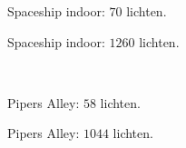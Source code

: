\begin{figure}[p]
  \begin{adjustbox}{minipage=\textwidth, scale=0.6}
    \begin{subfigure}[b]{0.83\textwidth}
      \centering
      \def\svgwidth{\textwidth}
      
      \caption{Spaceship indoor: $70$ lichten.}
      \label{fig:hs-nodesize-construction-time::si-low}
    \end{subfigure}
  \end{adjustbox} %
  \begin{adjustbox}{minipage=\textwidth, scale=0.6}
    \begin{subfigure}[b]{0.83\textwidth}
      \centering
      \def\svgwidth{\textwidth}
      
      \caption{Spaceship indoor: $1260$ lichten.}
      \label{fig:hs-nodesize-construction-time::si-high}
    \end{subfigure}
  \end{adjustbox} \\
  \begin{adjustbox}{minipage=\textwidth, scale=0.6}
    \begin{subfigure}[b]{0.83\textwidth}
      \centering
      \def\svgwidth{\textwidth}
      
      \caption{Pipers Alley: $58$ lichten.}
      \label{fig:hs-nodesize-construction-time::pa-low}
    \end{subfigure}
  \end{adjustbox} %
  \begin{adjustbox}{minipage=\textwidth, scale=0.6}
    \begin{subfigure}[b]{0.83\textwidth}
      \centering
      \def\svgwidth{\textwidth}
      
      \caption{Pipers Alley: $1044$ lichten.}
      \label{fig:hs-nodesize-construction-time::pa-high}
    \end{subfigure}
  \end{adjustbox} \\
  \begin{adjustbox}{minipage=\textwidth, scale=0.6}
    \begin{subfigure}[b]{0.83\textwidth}
      \centering
      \def\svgwidth{\textwidth}
      

\end{subfigure}
\end{adjustbox}
\end{figure}

